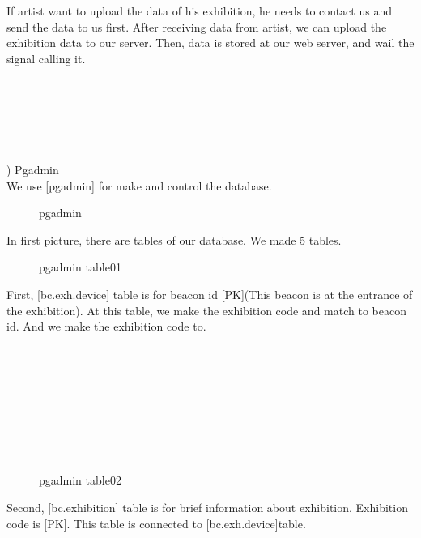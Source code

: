 \documentclass[conference]{IEEEtran}
\begin{document}
If artist want to upload the data of his exhibition, he needs to contact us and send the data to us first. After receiving data from artist, we can upload the exhibition data to our server. Then, data is stored at our web server, and wail the signal calling it.\\\\\\\\\\\\\\

) Pgadmin \\

We use [pgadmin] for make and control the database. 
\begin{figure}[htbp]
\begin{center}
    \caption{pgadmin} 
\end{center}
\end{figure}

In first picture, there are tables of our database. We made 5 tables.\\

\begin{figure}[htbp]
\begin{center}
    \caption{pgadmin table01} 
\end{center}
\end{figure}

First, [bc.exh.device] table is for beacon id [PK](This beacon is at the entrance of the exhibition). At this table, we make the exhibition code and match to beacon id. And we make the exhibition code to.\\\\\\\\\\\\\\\\\\


\begin{figure}[htbp]
\begin{center}
    \caption{pgadmin table02} 
\end{center}
\end{figure}

Second, [bc.exhibition] table is for  brief information about exhibition. Exhibition code is  [PK]. This table is connected to [bc.exh.device]table.\\
\end{document}

